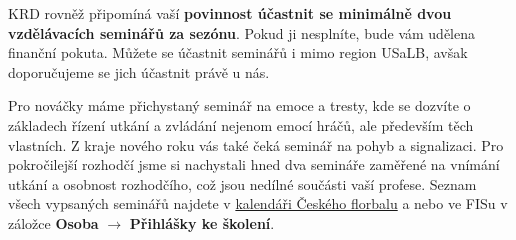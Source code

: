 \documentclass{newsletter}
\begin{document}
KRD rovněž připomíná vaší \textcolor{cfred}{\textbf{povinnost účastnit se minimálně dvou vzdělávacích seminářů za sezónu}}. Pokud ji nesplníte, bude vám udělena finanční pokuta. Můžete se účastnit seminářů i mimo region USaLB, avšak doporučujeme se jich účastnit právě u nás. 

Pro nováčky máme přichystaný seminář na emoce a tresty, kde se dozvíte o základech řízení utkání a zvládání nejenom emocí hráčů, ale především těch vlastních. Z kraje nového roku vás také čeká seminář na pohyb a signalizaci. Pro pokročilejší rozhodčí jsme si nachystali hned dva semináře zaměřené na vnímání utkání a osobnost rozhodčího, což jsou nedílné součásti vaší profese. Seznam všech vypsaných seminářů najdete v \href{https://www.ceskyflorbal.cz/calendar/?filter%5BmanagingAuthority%5D=2&filter%5BcommitteeType%5D=5}{kalendáři Českého florbalu} a nebo ve FISu v záložce \textbf{Osoba} $\to$ \textbf{Přihlášky ke školení}.
\end{document}
